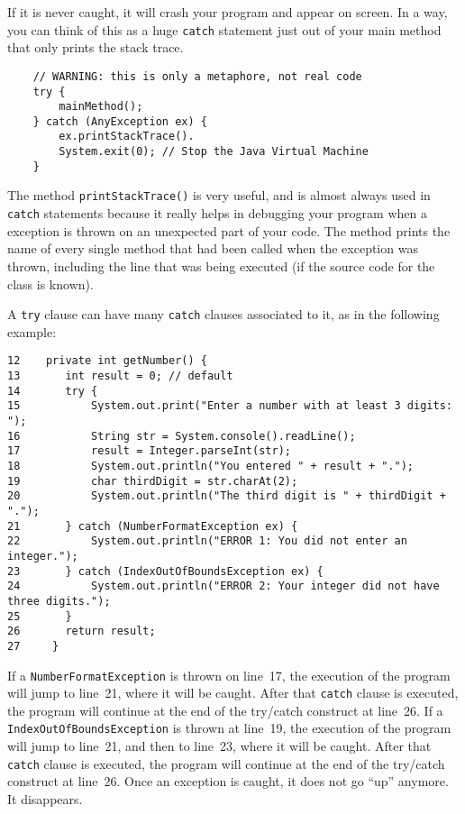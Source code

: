 If it is never caught, it
will crash your program and appear on screen. 
In a way, you can think
of this as a huge \verb+catch+ statement just out of your main method
that only prints the stack trace.

\begin{verbatim}
    // WARNING: this is only a metaphore, not real code
    try {
        mainMethod();
    } catch (AnyException ex) {
        ex.printStackTrace().
        System.exit(0); // Stop the Java Virtual Machine
    }
\end{verbatim}

The method \verb+printStackTrace()+ is very useful, and is almost
always used in \verb+catch+ statements because it really helps in
debugging your program when a exception is thrown on an unexpected
part of your code. 
The method prints the name of every single method that had been
called when the exception was thrown, including the line that was
being executed (if the source code for the class is known). 

A \verb+try+ clause can have many \verb+catch+ clauses associated to
it, as in the following example: 

\begin{verbatim}
12    private int getNumber() {
13       int result = 0; // default
14       try {
15           System.out.print("Enter a number with at least 3 digits: ");
16           String str = System.console().readLine();
17           result = Integer.parseInt(str);
18           System.out.println("You entered " + result + ".");
19           char thirdDigit = str.charAt(2);
20           System.out.println("The third digit is " + thirdDigit + ".");
21       } catch (NumberFormatException ex) {
22           System.out.println("ERROR 1: You did not enter an integer.");
23       } catch (IndexOutOfBoundsException ex) {
24           System.out.println("ERROR 2: Your integer did not have three digits.");
25       }
26       return result;
27     }
\end{verbatim}

If a \verb+NumberFormatException+ is thrown on line~17, the execution
of the program will jump to line~21, where it will be caught. After
that \verb+catch+ clause is executed, the program will continue at the
end of the try/catch construct at line~26. If a
\verb+IndexOutOfBoundsException+ is thrown at line~19, the execution
of the program will jump to line~21, and then to line~23, where it
will be caught. After that \verb+catch+ clause is executed, the
program will continue at the end of the try/catch construct at
line~26.  
Once an exception is caught, it does not go ``up'' anymore. It
disappears. 



